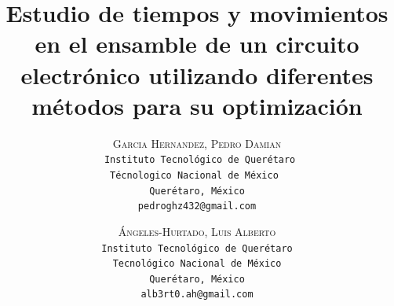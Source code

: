     \lfoot{ \thepage}
    
    \setlength{\droptitle}{-5\baselineskip} %
    \title{\textbf{Estudio de tiempos y movimientos en el ensamble de un circuito electrónico utilizando diferentes métodos para su optimización }} %
    
     \author{ 
     \textsc{Garcia Hernandez, Pedro Damian}\\ 
     \texttt{ Instituto Tecnológico de Querétaro} \\ 
     \texttt{Técnologico Nacional de México } \\ 
     \texttt{Querétaro, México}\\ 
     \texttt{pedroghz432@gmail.com} 
     \and 
     \textsc{Ángeles-Hurtado, Luis Alberto}\\ 
     \texttt{ Instituto Tecnológico de Querétaro } \\ 
     \texttt{ Tecnológico Nacional de México } \\ 
     \texttt{Querétaro, México}\\ 
     \texttt{alb3rt0.ah@gmail.com} 
    }
    
